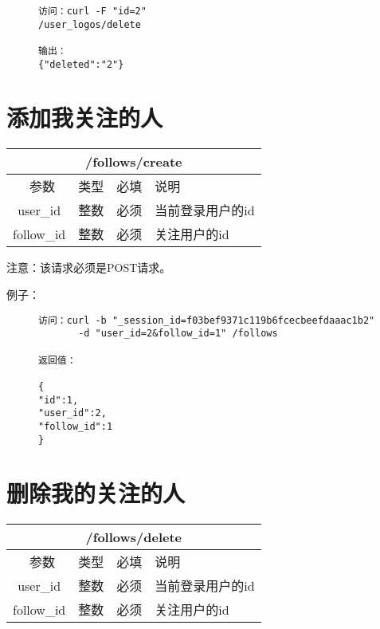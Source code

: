 \documentclass[cs4size]{ctexartutf8}
\begin{document}
\begin{figure}[H]
\begin{verbatim}
访问：curl -F "id=2" 
/user_logos/delete

输出：
{"deleted":"2"}

\end{verbatim}
\end{figure}



\section{添加我关注的人}

\begin{table}[H]
   \begin{center}
\begin{tabular}{|c|c|c|p{12cm}|}
\hline
\multicolumn{4}{|c|}{/follows/create} \\
\hline\hline
 \  参数  & 类型 & 必填 &  说明  \\
\hline
 user\_id  & 整数 & 必须 &  当前登录用户的id\\
\hline
 follow\_id  & 整数 & 必须 &  关注用户的id\\
\hline
\end{tabular}
   \end{center}
\end{table}

注意：该请求必须是POST请求。

例子：

\begin{figure}[H]
\begin{verbatim}
访问：curl -b "_session_id=f03bef9371c119b6fcecbeefdaaac1b2"
       -d "user_id=2&follow_id=1" /follows

返回值：

{
"id":1,
"user_id":2,
"follow_id":1
}

\end{verbatim}
\end{figure}



\section{删除我的关注的人}

\begin{table}[H]
   \begin{center}
\begin{tabular}{|c|c|c|p{12cm}|}
\hline
\multicolumn{4}{|c|}{/follows/delete} \\
\hline\hline
 \  参数  & 类型 & 必填 &  说明  \\
\hline
 user\_id  & 整数 & 必须 &  当前登录用户的id\\
\hline
 follow\_id  & 整数 & 必须 &  关注用户的id\\
\hline
\end{tabular}
   \end{center}
\end{table}
\end{document}
